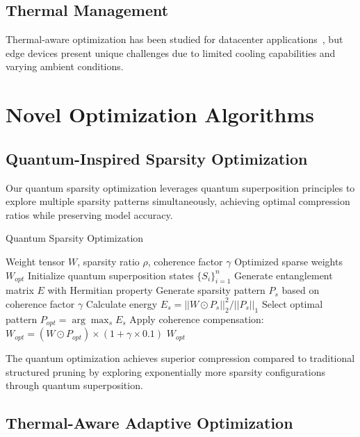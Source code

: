 \documentclass[conference]{IEEEtran}
\begin{document}
\subsection{Thermal Management}

Thermal-aware optimization has been studied for datacenter applications~\cite{pedram2012thermal}, but edge devices present unique challenges due to limited cooling capabilities and varying ambient conditions.

\section{Novel Optimization Algorithms}

\subsection{Quantum-Inspired Sparsity Optimization}

Our quantum sparsity optimization leverages quantum superposition principles to explore multiple sparsity patterns simultaneously, achieving optimal compression ratios while preserving model accuracy.

\begin{algorithm}
\caption{Quantum Sparsity Optimization}
\label{alg:quantum_sparsity}
\begin{algorithmic}[1]
\REQUIRE Weight tensor $W$, sparsity ratio $\rho$, coherence factor $\gamma$
\ENSURE Optimized sparse weights $W_{opt}$
\STATE Initialize quantum superposition states $\{S_i\}_{i=1}^n$
\STATE Generate entanglement matrix $E$ with Hermitian property
    \STATE Generate sparsity pattern $P_s$ based on coherence factor $\gamma$
    \STATE Calculate energy $E_s = ||W \odot P_s||_2^2 / ||P_s||_1$
\ENDFOR
\STATE Select optimal pattern $P_{opt} = \arg\max_s E_s$
\STATE Apply coherence compensation: $W_{opt} = (W \odot P_{opt}) \times (1 + \gamma \times 0.1)$
\RETURN $W_{opt}$
\end{algorithmic}
\end{algorithm}

The quantum optimization achieves superior compression compared to traditional structured pruning by exploring exponentially more sparsity configurations through quantum superposition.

\subsection{Thermal-Aware Adaptive Optimization}
\end{document}
